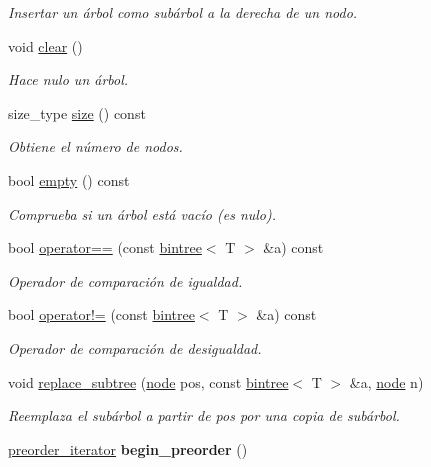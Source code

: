 \begin{DoxyCompactItemize}
\begin{DoxyCompactList}\small\item\em Insertar un árbol como subárbol a la derecha de un nodo. \end{DoxyCompactList}\item 
void \hyperlink{classbintree_a2078f7f9254a84b592fdb1f2e2f9238a}{clear} ()
\begin{DoxyCompactList}\small\item\em Hace nulo un árbol. \end{DoxyCompactList}\item 
size\+\_\+type \hyperlink{classbintree_a05abb18037587082a67fb4d4d2f5733f}{size} () const 
\begin{DoxyCompactList}\small\item\em Obtiene el número de nodos. \end{DoxyCompactList}\item 
bool \hyperlink{classbintree_a772126c3e8b7cd37e5a93ccbda01f8dd}{empty} () const 
\begin{DoxyCompactList}\small\item\em Comprueba si un árbol está vacío (es nulo). \end{DoxyCompactList}\item 
bool \hyperlink{classbintree_a29438cd817b1d27ccc10d46676ba6bef}{operator==} (const \hyperlink{classbintree}{bintree}$<$ T $>$ \&a) const 
\begin{DoxyCompactList}\small\item\em Operador de comparación de igualdad. \end{DoxyCompactList}\item 
bool \hyperlink{classbintree_a80e397f887ebad1ef974ec7722430a6c}{operator!=} (const \hyperlink{classbintree}{bintree}$<$ T $>$ \&a) const 
\begin{DoxyCompactList}\small\item\em Operador de comparación de desigualdad. \end{DoxyCompactList}\item 
void \hyperlink{classbintree_a75647277e4d20981651450e86ffad165}{replace\+\_\+subtree} (\hyperlink{classbintree_1_1node}{node} pos, const \hyperlink{classbintree}{bintree}$<$ T $>$ \&a, \hyperlink{classbintree_1_1node}{node} n)
\begin{DoxyCompactList}\small\item\em Reemplaza el subárbol a partir de pos por una copia de subárbol. \end{DoxyCompactList}\item 
\hypertarget{classbintree_aa03570e8e81b0f6e12a0901caa631973}{\hyperlink{classbintree_1_1preorder__iterator}{preorder\+\_\+iterator} {\bfseries begin\+\_\+preorder} ()}\label{classbintree_aa03570e8e81b0f6e12a0901caa631973}


\end{DoxyCompactItemize}
